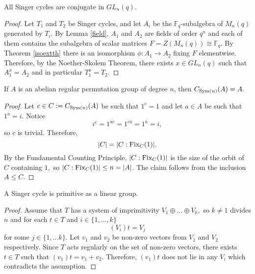 \begin{Lem}\label{singconj} 
All Singer cycles are conjugate in $GL_n(q).$ 
\end{Lem}
\begin{proof}
Let $T_1$ and $T_2$ be  Singer cycles, and let $A_i$   be the $\mathbb{F}_q$-subalgebra of $M_n(q)$ generated by $T_i$. By Lemma \ref{field}, $A_1$ and  $A_2$ are fields of order $q^n$ and each of them contains  the subalgebra of scalar matrices $F=Z(M_n(q)) \cong \mathbb{F}_q.$ By Theorem \ref{isoextth} there is an isomorphism $\phi: A_1 \to A_2$ fixing $F$ elementwise. Therefore, by the Noether-Skolem Theorem, there exists $x \in GL_n(q)$ such that $A_1^x=A_2$ and in particular $T_1^x=T_2.$
\end{proof} 



\begin{Lem}\label{centr} 
If $A$ is an abelian regular permutation group of degree $n$, then $C_{\mathrm{Sym}(n)}(A)=A.$
\end{Lem}
\begin{proof}
Let $c \in C:= C_{\mathrm{Sym}(n)}(A)$ be such that $1^c=1$ and let $a \in A$ be such that $1^a=i.$ Notice
$$i^c=1^{ac}=1^{ca}=1^{a}=i,$$ so $c$ is trivial. Therefore, 
$$|C|=|C:\mathrm{Fix}_{C}(1)|.$$
By the Fundamental Counting Principle, $|C:\mathrm{Fix}_{C}(1)|$ is the size of the orbit of $C$ containing $1,$ so $|C:\mathrm{Fix}_{C}(1)| \le n=|A|$.
 The claim follows from the inclusion $A \le C$. 
\end{proof}

\begin{Lem}%
A Singer cycle is primitive as a linear group.
\end{Lem}
\begin{proof}
Assume that $T$ has a system of imprimitivity
$V_1 \oplus \ldots \oplus V_k,$
so $k \ne 1$ divides $n$ and for each $t \in T$ and $i \in \{1,\ldots, k\}$
 $$(V_i)t=V_j$$
for some $j \in \{1,\ldots k\}.$ Let $v_1$ and $v_2$ be non-zero vectors from $V_1$ and $V_2$ respectively. Since $T$ acts regularly on the set of non-zero vectors, there exists $t \in T$ such that $(v_1)t=v_1+v_2$. Therefore, $(v_1)t$ does not lie in any $V_i$ which contradicts the assumption.  
\end{proof}

